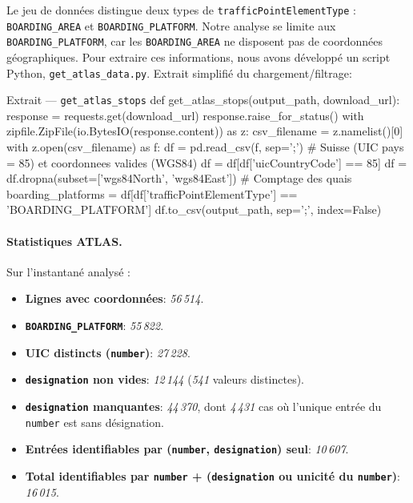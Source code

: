 Le jeu de données distingue deux types de \texttt{trafficPointElementType} : \texttt{BOARDING\_AREA} et \texttt{BOARDING\_PLATFORM}. Notre analyse se limite aux \texttt{BOARDING\_PLATFORM}, car les \texttt{BOARDING\_AREA} ne disposent pas de coordonnées géographiques. Pour extraire ces informations, nous avons développé un script Python, \texttt{get\_atlas\_data.py}. Extrait simplifié du chargement/filtrage:

\begin{codebox}[language=Python]{Extrait — \texttt{get\_atlas\_stops}}
def get_atlas_stops(output_path, download_url):
    response = requests.get(download_url)
    response.raise_for_status()
    with zipfile.ZipFile(io.BytesIO(response.content)) as z:
        csv_filename = z.namelist()[0]
        with z.open(csv_filename) as f:
            df = pd.read_csv(f, sep=';')
            # Suisse (UIC pays = 85) et coordonnees valides (WGS84)
            df = df[df['uicCountryCode'] == 85]
            df = df.dropna(subset=['wgs84North', 'wgs84East'])
            # Comptage des quais
            boarding_platforms = df[df['trafficPointElementType'] == 'BOARDING_PLATFORM']
            df.to_csv(output_path, sep=';', index=False)
\end{codebox}



\paragraph{Statistiques ATLAS.} Sur l'instantané analysé :
\begin{itemize}
  \item \textbf{Lignes avec coordonnées}: \textit{56\,514}.
  \item \textbf{\texttt{BOARDING\_PLATFORM}}: \textit{55\,822}.
  \item \textbf{UIC distincts (\texttt{number})}: \textit{27\,228}.
  \item \textbf{\texttt{designation} non vides}: \textit{12\,144} (\textit{541} valeurs distinctes).
  \item \textbf{\texttt{designation} manquantes}: \textit{44\,370}, dont \textit{4\,431} cas où l'unique entrée du \texttt{number} est sans désignation.
  \item \textbf{Entrées identifiables par (\texttt{number}, \texttt{designation}) seul}: \textit{10\,607}.
  \item \textbf{Total identifiables par \texttt{number} + (\texttt{designation} ou unicité du \texttt{number})}: \textit{16\,015}.
\end{itemize}

